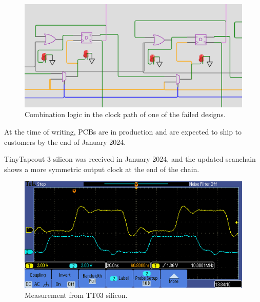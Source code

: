 \begin{figure}[htp]
\centering
\includegraphics[width=\columnwidth]{./Figs/wokwi mux clock logic.png}
\caption{Combination logic in the clock path of one of the failed designs.}
\label{fig:failed_design_comb_logic}
\end{figure}

At the time of writing, PCBs are in production and are expected to ship to customers by the end of January 2024.

TinyTapeout 3 silicon was received in January 2024, and the updated scanchain shows a more symmetric output clock at the end of the chain.

\begin{figure}[htp]
\centering
\includegraphics[width=\columnwidth]{./Figs/tt03_clock_out.png}
\caption{Measurement from TT03 silicon.}
\label{fig:TT03_silicon_measurement}
\end{figure}
